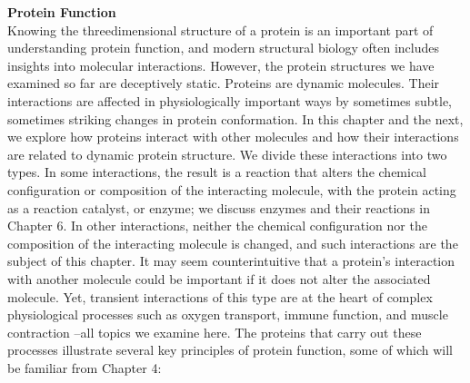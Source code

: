 \textbf{Protein Function}\\
Knowing the threedimensional structure of a protein is an important part of understanding protein function, and modern structural biology often includes insights into molecular interactions. However, the protein structures we have examined so far are deceptively static. Proteins are dynamic molecules. Their interactions are affected in physiologically important ways by sometimes subtle, sometimes striking changes in protein conformation. In this chapter and the next, we explore how proteins interact with other molecules and how their interactions are related to dynamic protein structure. 
We divide these interactions into two types. In some interactions, the result is a reaction that alters the chemical configuration or composition of the interacting molecule, with the protein acting as a reaction catalyst, or enzyme; we discuss enzymes and their reactions in Chapter 6. In other interactions, neither the chemical configuration nor the composition of the interacting molecule is changed, and such interactions are the subject of this chapter.
It may seem counterintuitive that a protein’s interaction with another molecule could be important if it does not alter the associated molecule. Yet, transient interactions of this type are at the heart of complex physiological processes such as oxygen transport, immune function, and muscle contraction --all topics we examine here. The proteins that carry out these processes illustrate several key principles of protein function, some of which will be familiar from Chapter 4: 
